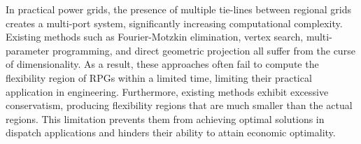 In practical power grids, the presence of multiple tie-lines between regional grids creates a multi-port system, significantly increasing computational complexity. 
Existing methods such as Fourier-Motzkin elimination, vertex search, multi-parameter programming, and direct geometric projection all suffer from the curse of dimensionality. 
As a result, these approaches often fail to compute the flexibility region of RPGs within a limited time, limiting their practical application in engineering.  
Furthermore, existing methods exhibit excessive conservatism, producing flexibility regions that are much smaller than the actual regions.
This limitation prevents them from achieving optimal solutions in dispatch applications and hinders their ability to attain economic optimality.